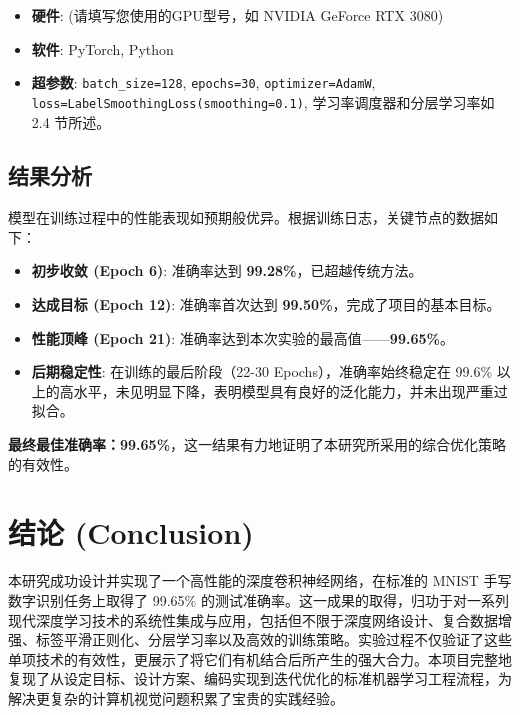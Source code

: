 \documentclass[UTF8]{ctexart}
\begin{document}
\begin{itemize}
    \item \textbf{硬件}: (请填写您使用的GPU型号，如 NVIDIA GeForce RTX 3080)
    \item \textbf{软件}: PyTorch, Python
    \item \textbf{超参数}: \texttt{batch\_size=128}, \texttt{epochs=30}, \texttt{optimizer=AdamW}, \texttt{loss=LabelSmoothingLoss(smoothing=0.1)}, 学习率调度器和分层学习率如 2.4 节所述。
\end{itemize}

\subsection{结果分析}

模型在训练过程中的性能表现如预期般优异。根据训练日志，关键节点的数据如下：

\begin{itemize}
    \item \textbf{初步收敛 (Epoch 6)}: 准确率达到 \textbf{99.28\%}，已超越传统方法。
    \item \textbf{达成目标 (Epoch 12)}: 准确率首次达到 \textbf{99.50\%}，完成了项目的基本目标。
    \item \textbf{性能顶峰 (Epoch 21)}: 准确率达到本次实验的最高值——\textbf{99.65\%}。
    \item \textbf{后期稳定性}: 在训练的最后阶段（22-30 Epochs），准确率始终稳定在 99.6\% 以上的高水平，未见明显下降，表明模型具有良好的泛化能力，并未出现严重过拟合。
\end{itemize}

\textbf{最终最佳准确率：99.65\%}，这一结果有力地证明了本研究所采用的综合优化策略的有效性。

\section{结论 (Conclusion)}

本研究成功设计并实现了一个高性能的深度卷积神经网络，在标准的 MNIST 手写数字识别任务上取得了 99.65\% 的测试准确率。这一成果的取得，归功于对一系列现代深度学习技术的系统性集成与应用，包括但不限于深度网络设计、复合数据增强、标签平滑正则化、分层学习率以及高效的训练策略。实验过程不仅验证了这些单项技术的有效性，更展示了将它们有机结合后所产生的强大合力。本项目完整地复现了从设定目标、设计方案、编码实现到迭代优化的标准机器学习工程流程，为解决更复杂的计算机视觉问题积累了宝贵的实践经验。
\end{document}
